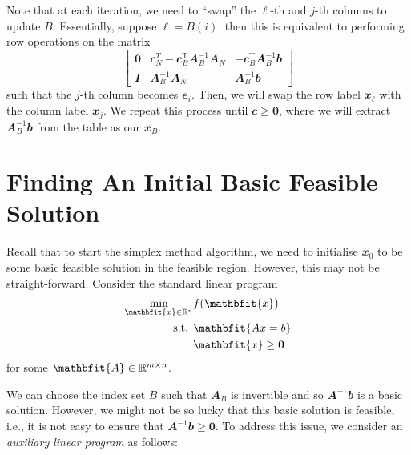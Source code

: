 \documentclass[math, code]{amznotes}
\theoremstyle{remark}
\begin{document}
Note that at each iteration, we need to ``swap'' the $\ell$-th and $j$-th columns to update $B$. Essentially, suppose $\ell = B(i)$, then this is equivalent to performing row operations on the matrix 
\begin{equation*}
    \begin{bmatrix}
        \mathbf{0} & \mathbfit{c}_N^{T} - \mathbfit{c}_B^{\mathrm{T}}\mathbfit{A}_B^{-1}\mathbfit{A}_N & -\mathbfit{c}_B^{\mathrm{T}}\mathbfit{A}_B^{-1}\mathbfit{b} \\
        \mathbfit{I} & \mathbfit{A}_B^{-1}\mathbfit{A}_N & \mathbfit{A}_B^{-1}\mathbfit{b}
    \end{bmatrix}
\end{equation*}
such that the $j$-th column becomes $\mathbfit{e}_{i}$. Then, we will swap the row label $\mathbfit{x}_{\ell}$ with the column label $\mathbfit{x}_j$. We repeat this process until $\mathbfit{\bar{c}} \geq \mathbf{0}$, where we will extract $\mathbfit{A}_B^{-1}\mathbfit{b}$ from the table as our $\mathbfit{x}_B$.
\section{Finding An Initial Basic Feasible Solution}
Recall that to start the simplex method algorithm, we need to initialise $\mathbfit{x}_0$ to be some basic feasible solution in the feasible region. However, this may not be straight-forward. Consider the standard linear program
\begin{align*}
    \min_{\mathbfit{x} \in \R^n} & f(\mathbfit{x}) \\
    \textrm{s.t. } & \mathbfit{Ax = b} \\
    & \mathbfit{x} \geq \mathbf{0}
\end{align*}
for some $\mathbfit{A} \in \R^{m \times n}$.

We can choose the index set $B$ such that $\mathbfit{A}_B$ is invertible and so $\mathbfit{A}^{-1}\mathbfit{b}$ is a basic solution. However, we might not be so lucky that this basic solution is feasible, i.e., it is not easy to ensure that $\mathbfit{A}^{-1}\mathbfit{b} \geq \mathbf{0}$. To address this issue, we consider an \textit{auxiliary linear program} as follows:
\end{document}
